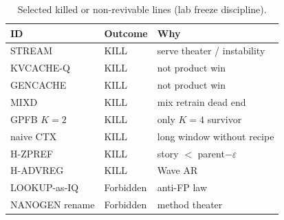 \begin{table}[t]
\centering
\caption{Selected killed or non-revivable lines (lab freeze discipline).}
\label{tab:kills}
\begin{tabular}{lll}
\toprule
ID & Outcome & Why \\
\midrule
STREAM & KILL & serve theater / instability \\
KVCACHE-Q & KILL & not product win \\
GENCACHE & KILL & not product win \\
MIXD & KILL & mix retrain dead end \\
GPFB $K{=}2$ & KILL & only $K{=}4$ survivor \\
naive CTX & KILL & long window without recipe \\
H-ZPREF & KILL & story $<$ parent$-\varepsilon$ \\
H-ADVREG & KILL & Wave AR \\
LOOKUP-as-IQ & Forbidden & anti-FP law \\
NANOGEN rename & Forbidden & method theater \\
\bottomrule
\end{tabular}
\end{table}
